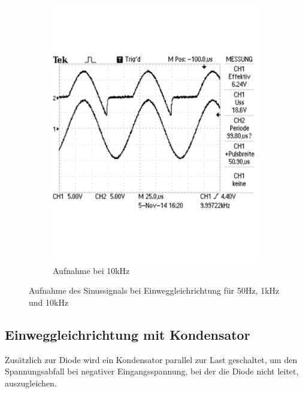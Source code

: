 \documentclass[12pt,a4paper]{article}
\begin{document}
\begin{figure}[H]
\begin{subfigure}[b]{0.28\textwidth}
        		\includegraphics[width=\textwidth, scale = 0.4]{2_1_3.pdf}
                \caption[Aufnahme bei 10kHz]{Aufnahme bei 10kHz}
  				\label{fig:2_1_3}
        \end{subfigure}
        \caption{Aufnahme des Sinussignals bei Einweggleichrichtung für 50Hz, 1kHz und 10kHz}
        \label{fig:2_1_rech_vergleich}
\end{figure}

\subsection{Einweggleichrichtung mit Kondensator}
Zusätzlich zur Diode wird ein Kondensator parallel zur Last geschaltet, um den Spannungsabfall bei negativer Eingangsspannung, bei der die Diode nicht leitet, auszugleichen.
\end{document}
